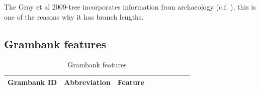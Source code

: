 \documentclass[a4paper,10pt]{article} %
\begin{document}
The Gray et al 2009-tree incorporates information from archaeology (c.f. \citet[92]{lynchrosscrowleyinternalsubgroupingoceanic}), this is one of the reasons why it has branch lengths.

\newpage
\subsection{Grambank features}
\label{Grambank_features}

\singlespacing
\begin{landscape}
\begin{longtable}{| l | p{4cm}| p{12cm}|p{2cm}|p{2cm}|p{2cm}|p{2cm}|p{2cm}|p{2cm}|}

\caption{{Grambank features}} \label{Grambank_features_table} \\
\hline
\textbf{Grambank ID} & \textbf{Abbreviation} & \textbf{Feature}\\ \hline
\endfirsthead


\end{longtable}
\end{landscape}
\end{document}
